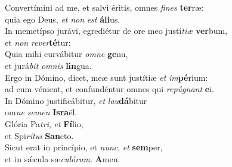 \evenverse Convertímini ad me, et salvi éritis, omnes \textit{fi}\textit{nes} \textbf{ter}ræ:~\*\\
\evenverse quia ego Deus, \textit{et} \textit{non} \textit{est} \textbf{á}\textbf{li}us.\\
\oddverse In memetípso jurávi, egrediétur de ore meo justí\textit{ti}\textit{æ} \textbf{ver}bum,~\*\\
\oddverse et \textit{non} \textit{re}\textit{ver}\textbf{té}tur:\\
\evenverse Quia mihi curvábitur \textit{om}\textit{ne} \textbf{ge}nu,~\*\\
\evenverse et jurá\textit{bit} \textit{om}\textit{nis} \textbf{lin}gua.\\
\oddverse Ergo in Dómino, dicet, meæ sunt justítiæ \textit{et} \textit{im}\textbf{pé}rium:~\*\\
\oddverse ad eum vénient, et confundéntur omnes qui \textit{re}\textit{pú}\textit{gnant} \textbf{e}i.\\
\evenverse In Dómino justificábitur, \textit{et} \textit{lau}\textbf{dá}bitur~\*\\
\evenverse om\textit{ne} \textit{se}\textit{men} \textbf{Is}\textbf{ra}ël.\\
\oddverse Glória Pa\textit{tri}, \textit{et} \textbf{Fí}lio,~\*\\
\oddverse et Spi\textit{rí}\textit{tu}\textit{i} \textbf{San}cto.\\
\evenverse Sicut erat in princípio, et \textit{nunc}, \textit{et} \textbf{sem}per,~\*\\
\evenverse et in sǽcula sæ\textit{cu}\textit{ló}\textit{rum}. \textbf{A}men.\\
